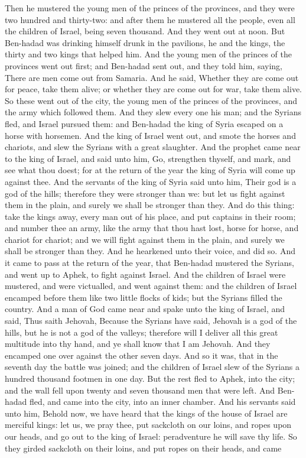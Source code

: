 Then he mustered the young men of the princes of the provinces, and they were two hundred and thirty-two: and after them he mustered all the people, even all the children of Israel, being seven thousand.  And they went out at noon. But Ben-hadad was drinking himself drunk in the pavilions, he and the kings, the thirty and two kings that helped him. And the young men of the princes of the provinces went out first; and Ben-hadad sent out, and they told him, saying, There are men come out from Samaria. And he said, Whether they are come out for peace, take them alive; or whether they are come out for war, take them alive. So these went out of the city, the young men of the princes of the provinces, and the army which followed them. And they slew every one his man; and the Syrians fled, and Israel pursued them: and Ben-hadad the king of Syria escaped on a horse with horsemen. And the king of Israel went out, and smote the horses and chariots, and slew the Syrians with a great slaughter.  And the prophet came near to the king of Israel, and said unto him, Go, strengthen thyself, and mark, and see what thou doest; for at the return of the year the king of Syria will come up against thee. And the servants of the king of Syria said unto him, Their god is a god of the hills; therefore they were stronger than we: but let us fight against them in the plain, and surely we shall be stronger than they. And do this thing: take the kings away, every man out of his place, and put captains in their room; and number thee an army, like the army that thou hast lost, horse for horse, and chariot for chariot; and we will fight against them in the plain, and surely we shall be stronger than they. And he hearkened unto their voice, and did so.  And it came to pass at the return of the year, that Ben-hadad mustered the Syrians, and went up to Aphek, to fight against Israel. And the children of Israel were mustered, and were victualled, and went against them: and the children of Israel encamped before them like two little flocks of kids; but the Syrians filled the country. And a man of God came near and spake unto the king of Israel, and said, Thus saith Jehovah, Because the Syrians have said, Jehovah is a god of the hills, but he is not a god of the valleys; therefore will I deliver all this great multitude into thy hand, and ye shall know that I am Jehovah. And they encamped one over against the other seven days. And so it was, that in the seventh day the battle was joined; and the children of Israel slew of the Syrians a hundred thousand footmen in one day. But the rest fled to Aphek, into the city; and the wall fell upon twenty and seven thousand men that were left. And Ben-hadad fled, and came into the city, into an inner chamber.  And his servants said unto him, Behold now, we have heard that the kings of the house of Israel are merciful kings: let us, we pray thee, put sackcloth on our loins, and ropes upon our heads, and go out to the king of Israel: peradventure he will save thy life. So they girded sackcloth on their loins, and put ropes on their heads, and came 